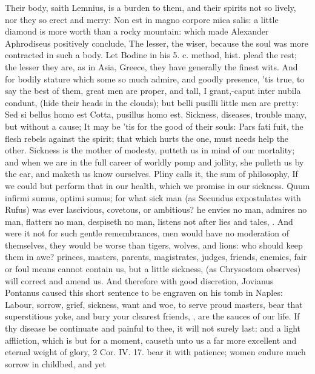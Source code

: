 {Their body, saith Lemnius, is a burden to them, and their spirits
not so lively, nor they so erect and merry: Non est in magno corpore
mica salis: a little diamond is more worth than a rocky mountain: which
made Alexander Aphrodiseus positively conclude, The lesser, the
wiser, because the soul was more contracted in such a body. Let
Bodine in his 5. c. method, hist. plead the rest; the lesser they are,
as in Asia, Greece, they have generally the finest wits. And for bodily
stature which some so much admire, and goodly presence, 'tis true, to
say the best of them, great men are proper, and tall, I grant,-caput
inter nubila condunt, (hide their heads in the clouds); but belli
pusilli little men are pretty: Sed si bellus homo est Cotta, pusillus
homo est. Sickness, diseases, trouble many, but without a cause;
It may be 'tis for the good of their souls: Pars fati fuit, the
flesh rebels against the spirit; that which hurts the one, must needs
help the other. Sickness is the mother of modesty, putteth us in mind
of our mortality; and when we are in the full career of worldly pomp
and jollity, she pulleth us by the ear, and maketh us know ourselves.
Pliny calls it, the sum of philosophy, If we could but perform
that in our health, which we promise in our sickness. Quum infirmi
sumus, optimi sumus; for what sick man (as  Secundus
expostulates with Rufus) was ever lascivious, covetous, or ambitious?
he envies no man, admires no man, flatters no man, despiseth no man,
listens not after lies and tales, \etc{}. And were it not for such gentle
remembrances, men would have no moderation of themselves, they would be
worse than tigers, wolves, and lions: who should keep them in awe?
princes, masters, parents, magistrates, judges, friends, enemies, fair
or foul means cannot contain us, but a little sickness, (as
Chrysostom observes) will correct and amend us. And therefore
with good discretion, Jovianus Pontanus caused this short
sentence to be engraven on his tomb in Naples: Labour, sorrow, grief,
sickness, want and woe, to serve proud masters, bear that superstitious
yoke, and bury your clearest friends, \etc{}, are the sauces of our life.
If thy disease be continuate and painful to thee, it will not surely
last: and a light affliction, which is but for a moment, causeth unto
us a far more excellent and eternal weight of glory, 2 Cor. IV. 17.
bear it with patience; women endure much sorrow in childbed, and yet
}
